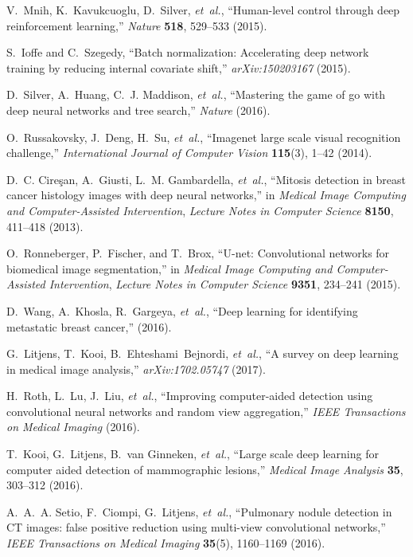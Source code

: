 \documentclass[12pt]{spieman}  %
\begin{document}
\begin{thebibliography}{10}
V.~Mnih, K.~Kavukcuoglu, D.~Silver, {\em et~al.}, ``Human-level control through
  deep reinforcement learning,'' {\em Nature} {\bf 518}, 529--533  (2015).

S.~Ioffe and C.~Szegedy, ``Batch normalization: Accelerating deep network
  training by reducing internal covariate shift,'' {\em arXiv:150203167}
  (2015).

D.~Silver, A.~Huang, C.~J. Maddison, {\em et~al.}, ``Mastering the game of go
  with deep neural networks and tree search,'' {\em Nature}   (2016).

O.~Russakovsky, J.~Deng, H.~Su, {\em et~al.}, ``Imagenet large scale visual
  recognition challenge,'' {\em International Journal of Computer Vision} {\bf
  115}(3), 1--42  (2014).

D.~C. Cire\c{s}an, A.~Giusti, L.~M. Gambardella, {\em et~al.}, ``Mitosis
  detection in breast cancer histology images with deep neural networks,'' in
  {\em Medical Image Computing and Computer-Assisted Intervention},  {\em
  Lecture Notes in Computer Science} {\bf 8150}, 411--418  (2013).

O.~Ronneberger, P.~Fischer, and T.~Brox, ``U-net: Convolutional networks for
  biomedical image segmentation,'' in {\em Medical Image Computing and
  Computer-Assisted Intervention},  {\em Lecture Notes in Computer Science}
  {\bf 9351}, 234--241  (2015).

D.~Wang, A.~Khosla, R.~Gargeya, {\em et~al.}, ``Deep learning for identifying
  metastatic breast cancer,''  (2016).

G.~Litjens, T.~Kooi, B.~Ehteshami~Bejnordi, {\em et~al.}, ``A survey on deep
  learning in medical image analysis,'' {\em arXiv:1702.05747}   (2017).

H.~Roth, L.~Lu, J.~Liu, {\em et~al.}, ``Improving computer-aided detection
  using convolutional neural networks and random view aggregation,'' {\em IEEE
  Transactions on Medical Imaging}   (2016).

T.~Kooi, G.~Litjens, B.~van Ginneken, {\em et~al.}, ``Large scale deep learning
  for computer aided detection of mammographic lesions,'' {\em Medical Image
  Analysis} {\bf 35}, 303--312  (2016).

A.~A.~A. Setio, F.~Ciompi, G.~Litjens, {\em et~al.}, ``Pulmonary nodule
  detection in {CT} images: false positive reduction using multi-view
  convolutional networks,'' {\em IEEE Transactions on Medical Imaging} {\bf
  35}(5), 1160--1169  (2016).


\end{thebibliography}
\end{document}
